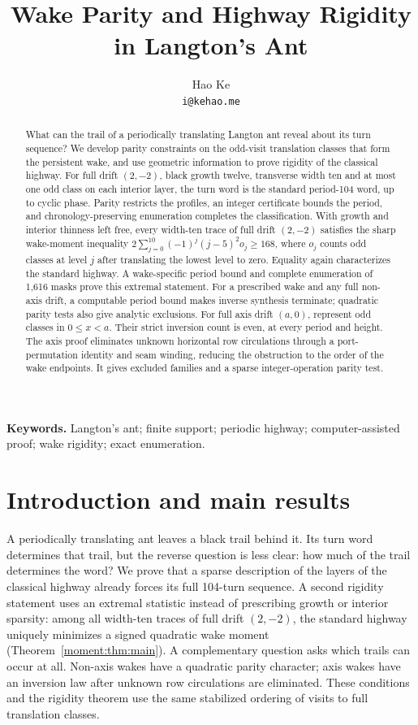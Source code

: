 \documentclass[11pt]{article}
\title{\bfseries Wake Parity and Highway Rigidity in Langton's Ant}
\author{Hao Ke\\\small\texttt{i@kehao.me}}
\date{}
\theoremstyle{definition}\newtheorem{definition}[theorem]{Definition}
\begin{document}
\maketitle
\begin{abstract}
What can the trail of a periodically translating Langton ant reveal about its
turn sequence? We develop parity constraints on the odd-visit translation
classes that form the persistent wake, and use geometric information to prove
rigidity of the classical highway. For full drift $(2,-2)$, black growth twelve,
transverse width ten and at most one odd class on each interior layer, the turn
word is the standard period-104 word, up to cyclic phase. Parity restricts the
profiles, an integer certificate bounds the period, and chronology-preserving
enumeration completes the classification. With growth and interior thinness
left free, every width-ten trace of full drift $(2,-2)$ satisfies the sharp
wake-moment inequality $2\sum_{j=0}^{10}(-1)^j(j-5)^2o_j\ge168$, where $o_j$
counts odd classes at level $j$ after translating the lowest level to zero.
Equality again characterizes the standard highway. A wake-specific period
bound and complete enumeration of 1,616 masks prove this extremal statement.
For a prescribed wake and any full
non-axis drift, a computable period bound makes inverse synthesis terminate;
quadratic parity tests also give analytic exclusions. For full axis drift
$(a,0)$, represent odd classes in $0\le x<a$. Their strict inversion count is
even, at every period and height. The axis proof eliminates unknown horizontal
row circulations through a port-permutation identity and seam winding, reducing
the obstruction to the order of the wake endpoints. It gives excluded families
and a sparse integer-operation parity test.
\end{abstract}
\noindent\textbf{Keywords.} Langton's ant; finite support; periodic highway;
computer-assisted proof; wake rigidity; exact enumeration.

\section{Introduction and main results}
A periodically translating ant leaves a black trail behind it. Its turn word
determines that trail, but the reverse question is less clear: how much of the
trail determines the word? We prove that a sparse description of the layers
of the classical highway already forces its full 104-turn sequence.
A second rigidity statement uses an extremal statistic instead of prescribing
growth or interior sparsity: among all width-ten traces of full drift $(2,-2)$,
the standard highway uniquely minimizes a signed quadratic wake moment
(Theorem~\ref{moment:thm:main}). A complementary question asks which trails can occur at all. Non-axis wakes
have a quadratic parity character; axis wakes have an inversion law after
unknown row circulations are eliminated. These conditions and the rigidity
theorem use the same stabilized ordering of visits to full translation classes.
\end{document}
